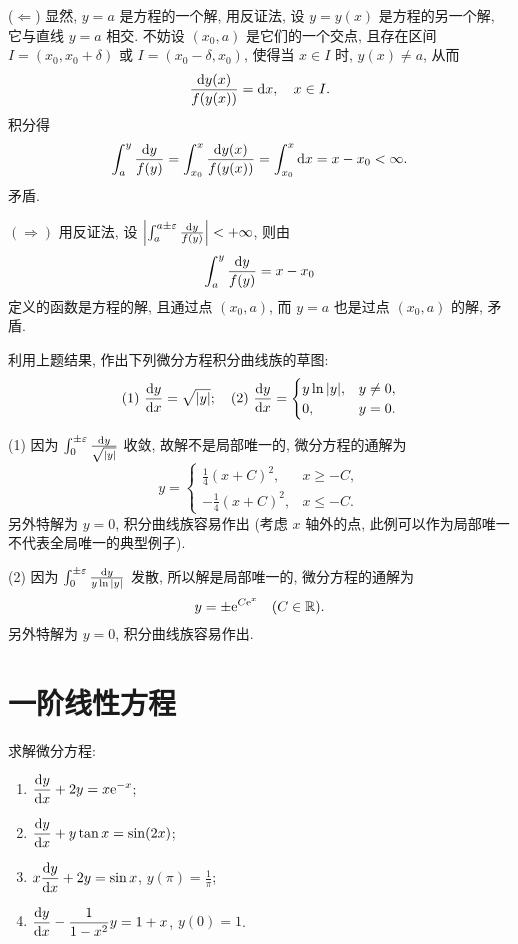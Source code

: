 \begin{solution}
  ($\Leftarrow$) 显然, $y=a$ 是方程的一个解, 用反证法, 设 $y=y(x)$ 是方程的另一个解, 
  它与直线 $y=a$ 相交. 不妨设 $(x_0,a)$ 是它们的一个交点, 
  且存在区间 $I=(x_0,x_0+\delta)$ 或 $I=(x_0-\delta,x_0)$, 
  使得当 $x\in I$ 时, $y(x)\neq a$, 从而
  \[\frac{\mathop{}\!\mathrm{d} y(x)}{f(y(x))}=\mathop{}\!\mathrm{d} x,\quad x\in I.\]
  积分得
  \[\int_a^y\frac{\mathop{}\!\mathrm{d} y}{f(y)}=\int_{x_0}^x\frac{\mathop{}\!\mathrm{d} y(x)}{f(y(x))}
    = \int_{x_0}^x\mathop{}\!\mathrm{d} x = x-x_0<\infty.\]
  矛盾.

  $(\Rightarrow)$ 用反证法, 设 $\left|\int_a^{a\pm\varepsilon}\frac{\mathop{}\!\mathrm{d} y}{f(y)}\right|<+\infty$,
  则由
  \[\int_a^y\frac{\mathop{}\!\mathrm{d} y}{f(y)}=x-x_0\]
  定义的函数是方程的解, 且通过点 $(x_0,a)$, 而 $y=a$ 也是过点 $(x_0,a)$ 的解, 矛盾.
\end{solution}



\begin{exercise}
  利用上题结果, 作出下列微分方程积分曲线族的草图:
  \[(1)\ \frac{\mathop{}\!\mathrm{d} y}{\mathop{}\!\mathrm{d} x}=\sqrt{|y|};\quad
    (2)\ \frac{\mathop{}\!\mathrm{d} y}{\mathop{}\!\mathrm{d} x}=
        \begin{cases}
          y\ln|y|, & y\neq 0, \\
          0,       & y=0.
        \end{cases}\]
\end{exercise}

\begin{solution}
(1) 因为 $\int_0^{\pm\varepsilon}\frac{\mathop{}\!\mathrm{d} y}{\sqrt{|y|}}$ 收敛, 故解不是局部唯一的, 微分方程的通解为
\[y=
  \begin{cases}
    \frac{1}{4}(x+C)^2,  & x\geq -C, \\
    -\frac{1}{4}(x+C)^2, & x\leq -C.
  \end{cases}\]
另外特解为 $y=0$, 积分曲线族容易作出 (考虑 $x$ 轴外的点, 此例可以作为局部唯一不代表全局唯一的典型例子).

(2) 因为 $\int_0^{\pm\varepsilon}\frac{\mathop{}\!\mathrm{d} y}{y\ln|y|}$ 发散, 所以解是局部唯一的, 微分方程的通解为
\[y=\pm\mathrm{e}^{C\mathrm{e}^x}\quad(C\in\mathbb{R}).\]
另外特解为 $y=0$, 积分曲线族容易作出.
\end{solution}



\section{一阶线性方程}



\begin{exercise}
  求解微分方程:
  \begin{enumerate}[(1)]
  \item $\displaystyle\frac{\mathop{}\!\mathrm{d} y}{\mathop{}\!\mathrm{d} x}+2y=x\mathrm{e}^{-x}$;
  \item $\displaystyle\frac{\mathop{}\!\mathrm{d} y}{\mathop{}\!\mathrm{d} x}+y\tan x=\sin(2x)$;
  \item $\displaystyle x\frac{\mathop{}\!\mathrm{d} y}{\mathop{}\!\mathrm{d} x}+2y=\sin x$, $y(\pi)=\frac{1}{\pi}$;
  \item $\displaystyle\frac{\mathop{}\!\mathrm{d} y}{\mathop{}\!\mathrm{d} x}-\frac{1}{1-x^2}y=1+x$, $y(0)=1$.
  \end{enumerate}
\end{exercise}

